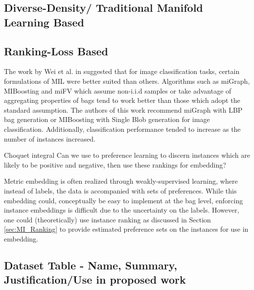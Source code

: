 \subsection{Diverse-Density/ Traditional Manifold Learning Based}

\subsection{Ranking-Loss Based}

The work by Wei et al. in \cite{Wei2016ImageBagGenerators} suggested that  for image classification tasks, certain formulations of MIL were better suited than others.  Algorithms such as miGraph, MIBoosting and miFV which assume non-i.i.d samples or take advantage of aggregating properties of bags tend to work better than those which adopt the standard assumption.  The authors of this work recommend miGraph with LBP bag generation or MIBoosting with Single Blob generation for image classification.  Additionally, classification performance tended to increase as the number of instances increased.

Choquet integral
Can we use to preference learning to discern instances which are likely to be positive and negative, then use these rankings for embedding?

Metric embedding is often realized through weakly-supervised learning, where instead of labels, the data is accompanied with sets of preferences. While this embedding could, conceptually be easy to implement at the bag level, enforcing instance embeddings is difficult due to the uncertainty on the labels.  However, one could (theoretically) use instance ranking as discussed in Section \ref{sec:MI_Ranking} to provide estimated preference sets on the instances for use in embedding.

\subsection{Dataset Table - Name, Summary, Justification/Use in proposed work}
